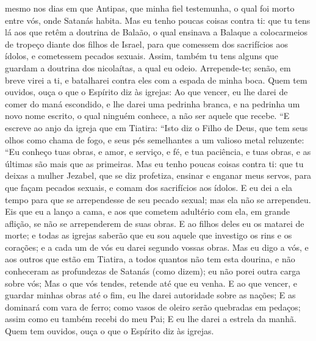 {{} mesmo nos dias em que Antipas, que
{} minha fiel testemunha, o qual foi morto entre vós, onde Satanás habita.
  Mas eu tenho
{} poucas coisas contra ti: que tu tens lá aos que retêm a doutrina de Balaão, o qual ensinava a Balaque a colocarmeios de tropeço diante dos filhos de Israel, para que comessem dos sacrifícios aos ídolos, e cometessem pecados sexuais.
  Assim, também tu tens alguns que guardam a doutrina dos nicolaítas, a qual eu odeio.
  Arrepende-te; senão, em breve virei a ti, e batalharei contra eles com a espada de minha boca.
  Quem tem ouvidos, ouça o que o Espírito diz às igrejas: Ao que vencer, eu lhe darei de comer do maná escondido, e lhe darei uma pedrinha branca, e na pedrinha um novo nome escrito, o qual ninguém conhece, a não ser aquele que
{} recebe.
  “E escreve ao anjo da igreja que
{} em Tiatira: “Isto diz o Filho de Deus, que tem seus olhos como chama de fogo, e seus pés semelhantes a um valioso metal reluzente:
  “Eu conheço tuas obras, e amor, e serviço, e fé, e tua paciência, e tuas obras, e
{} as últimas são mais que as primeiras.
  Mas eu tenho
{} poucas coisas contra ti: que tu deixas a mulher Jezabel, que se diz profetiza, ensinar e enganar meus servos, para que façam pecados sexuais, e comam dos sacrifícios aos ídolos.
  E eu dei a ela tempo para que se arrependesse de seu pecado sexual; mas ela não se arrependeu.
  Eis que eu a lanço a
{} cama, e aos que cometem adultério com ela, em grande aflição, se não se arrependerem de suas obras.
  E ao filhos deles eu os matarei de morte; e todas as igrejas saberão que eu sou aquele que investigo os rins e os corações; e a cada um de vós eu darei segundo vossas obras.
  Mas eu digo a vós, e aos outros que estão em Tiatira, a todos quantos não tem esta dourina, e não conheceram as profundezas de Satanás (como dizem); eu não porei outra carga sobre vós;
  Mas o que vós tendes, retende até que eu venha.
  E ao que vencer, e guardar minhas obras até o fim, eu lhe darei autoridade sobre as nações;
  E as dominará com vara de ferro; como vasos de oleiro serão quebradas em pedaços; assim como eu também recebi do meu Pai;
  E eu lhe darei a estrela da manhã.
  Quem tem ouvidos, ouça o que o Espírito diz às igrejas.
\par }

